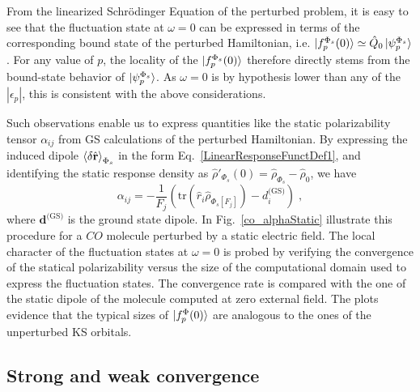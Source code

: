 \documentclass[reprint,aps,prb]{revtex4-1}
\newcommand{\eps}{\epsilon}
\newcommand{\be}{\begin{equation}}
\newcommand{\ee}{\end{equation}}
\newcommand{\op}[1]{\hat {#1}}
\newcommand{\trace}[1]{\mathrm{tr}\left(#1\right)}
\newcommand{\dmnot}{\op{\rho}_0}
\newcommand{\dm}{\op{\rho}}
\begin{document}
From the linearized Schr\"odinger Equation of the perturbed problem, it is easy to see that the fluctuation state at $\omega=0$ can be expressed
in terms of the corresponding bound state of the perturbed Hamiltonian, i.e.
$\ket{f_p^{\Phi_s}(0)} \simeq \op Q_0 \ket{\psi_p^{\Phi_s}}$.
For any value of $p$, the locality of the $\ket{f_p^{\Phi_s}(0)}$ therefore directly stems from the
bound-state behavior of $\ket{\psi_p^{\Phi_s}}$. As $\omega=0$ is by hypothesis 
lower than any of the $|\eps_p|$, this is consistent with the above considerations.

Such observations enable us to express quantities like the static polarizability tensor $\alpha_{ij}$ from GS calculations of the perturbed Hamiltonian.
By expressing the induced dipole $\braket{\delta \op{\mathbf r}}_{\Phi_s}$ in the form Eq.~\eqref{LinearResponseFunctDef1}, and identifying the static response density as $\dm'_{\Phi_s}(0) = \dm_{\Phi_s} -\dmnot $, we have
\be \label{staticalpha}
\alpha_{ij} = 
-\frac{1}{F_j} \left(\trace{\op r_i \dm_{\Phi_s[F_j]}} - d^{\text{(GS)}}_i \right)\;,
\ee
where $\mathbf d^\text{(GS)}$ is the ground state dipole.
In Fig.~\eqref{co_alphaStatic} illustrate this procedure for a $CO$ molecule 
perturbed by a static electric field. The local character of the fluctuation states at $\omega=0$ is 
probed by verifying the convergence of the statical polarizability versus 
the size of the computational domain used to express the fluctuation states. The convergence rate is compared with the 
one of the static dipole of the molecule computed at zero external field. 
The plots evidence that the typical sizes of $\ket{f^\Phi_p(0)}$ are analogous to the ones of the unperturbed KS orbitals. 

\subsection{Strong and weak convergence}
\end{document}
